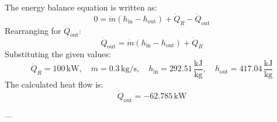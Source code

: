 The energy balance equation is written as:  
\[
0 = \dot{m}(h_{\text{in}} - h_{\text{out}}) + \dot{Q}_R - \dot{Q}_{\text{out}}
\]  
Rearranging for \(\dot{Q}_{\text{out}}\):  
\[
\dot{Q}_{\text{out}} = \dot{m}(h_{\text{in}} - h_{\text{out}}) + \dot{Q}_R
\]  
Substituting the given values:  
\[
\dot{Q}_R = 100 \, \text{kW}, \quad \dot{m} = 0.3 \, \text{kg/s}, \quad h_{\text{in}} = 292.51 \, \frac{\text{kJ}}{\text{kg}}, \quad h_{\text{out}} = 417.04 \, \frac{\text{kJ}}{\text{kg}}
\]  
The calculated heat flow is:  
\[
\dot{Q}_{\text{out}} = -62.785 \, \text{kW}
\]  

---